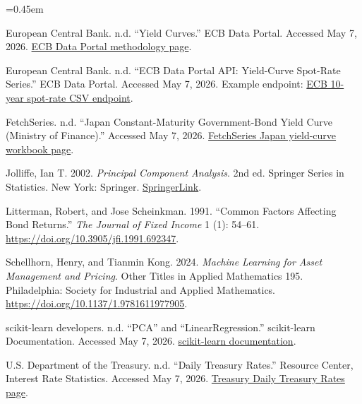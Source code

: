 \documentclass[11pt]{article}
\begin{document}
\begin{list}{}{\leftmargin=0.25in \itemindent=-0.25in \itemsep=0.45em}
\item European Central Bank. n.d. ``Yield Curves.'' ECB Data Portal. Accessed May 7, 2026. \href{https://data.ecb.europa.eu/methodology/yield-curves}{ECB Data Portal methodology page}.

\item European Central Bank. n.d. ``ECB Data Portal API: Yield-Curve Spot-Rate Series.'' ECB Data Portal. Accessed May 7, 2026. Example endpoint: \href{https://data-api.ecb.europa.eu/service/data/YC/B.U2.EUR.4F.G_N_C.SV_C_YM.SR_10Y?startPeriod=2004-09-06&format=csvdata}{ECB 10-year spot-rate CSV endpoint}.

\item FetchSeries. n.d. ``Japan Constant-Maturity Government-Bond Yield Curve (Ministry of Finance).'' Accessed May 7, 2026. \href{https://www.fetchseries.com/interest-rates/japan-constant-maturity-government-bond-yield-curve-ministry-of-finance/}{FetchSeries Japan yield-curve workbook page}.

\item Jolliffe, Ian T. 2002. \textit{Principal Component Analysis}. 2nd ed. Springer Series in Statistics. New York: Springer. \href{https://link.springer.com/book/10.1007/b98835}{SpringerLink}.

\item Litterman, Robert, and Jose Scheinkman. 1991. ``Common Factors Affecting Bond Returns.'' \textit{The Journal of Fixed Income} 1 (1): 54--61. \href{https://doi.org/10.3905/jfi.1991.692347}{https://doi.org/10.3905/jfi.1991.692347}.

\item Schellhorn, Henry, and Tianmin Kong. 2024. \textit{Machine Learning for Asset Management and Pricing}. Other Titles in Applied Mathematics 195. Philadelphia: Society for Industrial and Applied Mathematics. \href{https://doi.org/10.1137/1.9781611977905}{https://doi.org/10.1137/1.9781611977905}.

\item scikit-learn developers. n.d. ``PCA'' and ``LinearRegression.'' scikit-learn Documentation. Accessed May 7, 2026. \href{https://scikit-learn.org/}{scikit-learn documentation}.

\item U.S. Department of the Treasury. n.d. ``Daily Treasury Rates.'' Resource Center, Interest Rate Statistics. Accessed May 7, 2026. \href{https://home.treasury.gov/resource-center/data-chart-center/interest-rates/TextView?type=daily_treasury_yield_curve}{Treasury Daily Treasury Rates page}.
\end{list}
\end{document}
